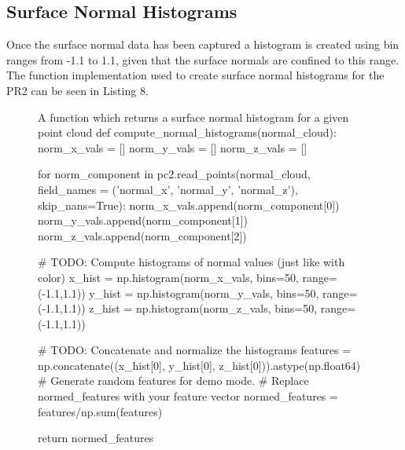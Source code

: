 \documentclass[a4paper]{article}
\begin{document}
\subsection{Surface Normal Histograms}
Once the surface normal data has been captured a histogram is created using bin ranges from -1.1 to 1.1, given that the surface normals are confined to this range. The function implementation used to create surface normal histograms for the PR2 can be seen in Listing 8.
\begin{figure}[h]\scriptsize
\begin{sexylisting}{A function which returns a surface normal histogram for a given point cloud}
def compute_normal_histograms(normal_cloud):
	norm_x_vals = []
	norm_y_vals = []
	norm_z_vals = []

	for norm_component in pc2.read_points(normal_cloud,
	field_names = ('normal_x', 'normal_y', 'normal_z'),
	skip_nans=True):
		norm_x_vals.append(norm_component[0])
		norm_y_vals.append(norm_component[1])
		norm_z_vals.append(norm_component[2])

	# TODO: Compute histograms of normal values (just like with color)
	x_hist = np.histogram(norm_x_vals, bins=50, range=(-1.1,1.1))
	y_hist = np.histogram(norm_y_vals, bins=50, range=(-1.1,1.1))
	z_hist = np.histogram(norm_z_vals, bins=50, range=(-1.1,1.1))

	# TODO: Concatenate and normalize the histograms
	features = np.concatenate((x_hist[0], y_hist[0], z_hist[0])).astype(np.float64)
	# Generate random features for demo mode.
	# Replace normed_features with your feature vector
	normed_features = features/np.sum(features)

	return normed_features	
\end{sexylisting}
\end{figure}
\end{document}
